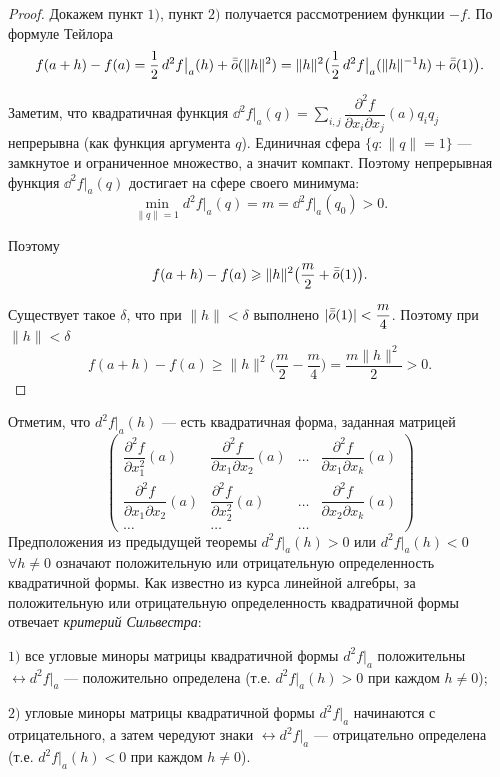 \documentclass[a4paper]{article}
\theoremstyle{named}
\begin{document}
    \begin{proof}
        Докажем пункт $1)$, пункт $2)$ получается рассмотрением функции $-f$.
        По формуле Тейлора
        $$
            f(a+h)-f(a) = \frac{1}{2}\mathop{}\!d^2f\bigl|_a(h) + \bar{\bar{o}}(\|h\|^2) =
            \|h\|^2\bigl(\frac{1}{2}\mathop{}\!d^2f\bigl|_a(\|h\|^{-1}h) + \bar{\bar{o}}(1)\bigr).
        $$
    
        Заметим, что квадратичная функция $\dd^2f\bigl|_a(q) = \sum_{i,j}\dfrac{\partial^2 f}{\partial x_i\partial x_j}(a)q_iq_j$ непрерывна (как функция аргумента $q$).
        Единичная сфера $\{q\colon \|q\|=1\}$ --- замкнутое и ограниченное множество, а значит компакт. Поэтому непрерывная функция $\dd^2f\bigl|_a(q)$ достигает на сфере
        своего минимума:
        $$
            \min\limits_{\|q\|=1}d^2f\bigl|_a(q) = m=\dd^2f\bigl|_a(q_0)>0.
        $$
    
        Поэтому
        $$
            f(a+h)-f(a) \geqslant \|h\|^2\bigl(\frac{m}{2} + \bar{\bar{o}}(1)\bigr).
        $$
    
        Существует такое $\delta$, что при $\|h\|<\delta$ выполнено	$|\bar{\bar{o}}(1)|<\dfrac{m}{4}$. 
        Поэтому при $\|h\|<\delta$
        $$
            f(a+h)-f(a)\geq	\|h\|^2\bigl(\frac{m}{2} -\frac{m}{4}\bigr)=\dfrac{m\|h\|^2}{2}>0.
        $$
    \end{proof}
    
    \begin{remark*}
        Отметим, что $d^2f\bigl|_a(h)$ --- есть квадратичная форма,
        заданная матрицей
        $$
        \begin{pmatrix}
          \dfrac{\partial^2f}{\partial x_1^2}(a) & \dfrac{\partial^2f}{\partial x_1\partial x_2}(a) & \ldots &  \dfrac{\partial^2f}{\partial x_1\partial x_k}(a) \\
          \dfrac{\partial^2f}{\partial x_1\partial x_2}(a) & \dfrac{\partial^2f}{\partial x_2^2}(a) & \ldots &  \dfrac{\partial^2f}{\partial x_2\partial x_k}(a)  \\
          \ldots & \ldots & \ldots
        \end{pmatrix}
        $$
        Предположения из предыдущей теоремы
        $d^2f\bigl|_a(h)>0$ или $d^2f\bigl|_a(h)<0$
        $\forall h\ne0$
        означают положительную или отрицательную определенность
        квадратичной формы.
        Как известно из курса линейной алгебры,
        за положительную или отрицательную определенность
        квадратичной формы отвечает {\it критерий Сильвестра}:
    
        $1)$ все угловые миноры матрицы квадратичной формы $d^2f\bigl|_a$ положительны
        $\leftrightarrow d^2f\bigl|_a$ --- положительно определена (т.е. $d^2f\bigl|_a(h)>0$ при каждом $h\ne0$);
    
        $2)$ угловые миноры матрицы квадратичной формы $d^2f\bigl|_a$
        начинаются с отрицательного, а затем чередуют знаки
        $\leftrightarrow d^2f\bigl|_a$ --- отрицательно определена (т.е. $d^2f\bigl|_a(h)<0$ при каждом $h\ne0$).
    \end{remark*}
\end{document}
